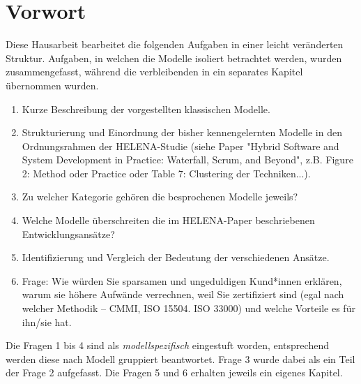 \section{Vorwort}
Diese Hausarbeit bearbeitet die folgenden Aufgaben in einer leicht veränderten Struktur. Aufgaben, in welchen die Modelle isoliert betrachtet werden, wurden zusammengefasst, während die verbleibenden in ein separates Kapitel übernommen wurden.

\begin{enumerate}
    \item Kurze Beschreibung der vorgestellten klassischen Modelle.
    \item Strukturierung und Einordnung der bisher kennengelernten Modelle in den Ordnungsrahmen der HELENA-Studie (siehe Paper "Hybrid Software and System Development in Practice: Waterfall, Scrum, and Beyond", z.B. Figure 2: Method oder Practice oder Table 7: Clustering der Techniken...). 
    \item Zu welcher Kategorie gehören die besprochenen Modelle jeweils?
    \item Welche Modelle überschreiten die im HELENA-Paper beschriebenen Entwicklungsansätze?
    \item Identifizierung und Vergleich der Bedeutung der verschiedenen Ansätze.
    \item Frage: Wie würden Sie sparsamen und ungeduldigen Kund*innen erklären,  warum sie höhere Aufwände verrechnen, weil  Sie zertifiziert sind (egal nach welcher Methodik – CMMI, ISO 15504. ISO 33000) und welche Vorteile es für ihn/sie hat.
\end{enumerate}

Die Fragen 1 bis 4 sind als \textit{modellspezifisch} eingestuft worden, entsprechend werden diese nach Modell gruppiert beantwortet. Frage 3 wurde dabei als ein Teil der Frage 2 aufgefasst. Die Fragen 5 und 6 erhalten jeweils ein eigenes Kapitel.

\newpage
\tableofcontents